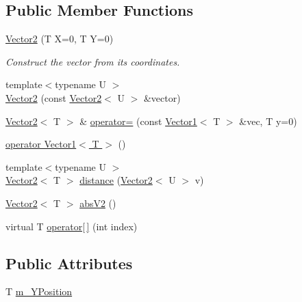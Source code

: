 \subsection*{Public Member Functions}
\begin{DoxyCompactItemize}
\item 
\hyperlink{class_tri_1_1_util_1_1_vector2_a5bd9af497b1e94182828557c8c32d9b2}{Vector2} (T X=0, T Y=0)
\begin{DoxyCompactList}\small\item\em Construct the vector from its coordinates. \end{DoxyCompactList}\item 
{\footnotesize template$<$typename U $>$ }\\\hyperlink{class_tri_1_1_util_1_1_vector2_a9e93686dcffd21464698f12a37b7f5c7}{Vector2} (const \hyperlink{class_tri_1_1_util_1_1_vector2}{Vector2}$<$ U $>$ \&vector)
\item 
\hyperlink{class_tri_1_1_util_1_1_vector2}{Vector2}$<$ T $>$ \& \hyperlink{class_tri_1_1_util_1_1_vector2_a0a679026dfa4fa180af2b77a2c0af691}{operator=} (const \hyperlink{class_tri_1_1_util_1_1_vector1}{Vector1}$<$ T $>$ \&vec, T y=0)
\item 
\hyperlink{class_tri_1_1_util_1_1_vector2_a2ad4acbe3cb1f0af438fe2b99fb04ea2}{operator Vector1$<$ T $>$} ()
\item 
{\footnotesize template$<$typename U $>$ }\\\hyperlink{class_tri_1_1_util_1_1_vector2}{Vector2}$<$ T $>$ \hyperlink{class_tri_1_1_util_1_1_vector2_a958c40bacc64414b2e7605a9aa0795bb}{distance} (\hyperlink{class_tri_1_1_util_1_1_vector2}{Vector2}$<$ U $>$ v)
\item 
\hyperlink{class_tri_1_1_util_1_1_vector2}{Vector2}$<$ T $>$ \hyperlink{class_tri_1_1_util_1_1_vector2_a1030fb4c61ebb13be8127ef599644fd8}{abs\+V2} ()
\item 
virtual T \hyperlink{class_tri_1_1_util_1_1_vector2_a0b6ad3a90190a53461edd5905484d60c}{operator\mbox{[}$\,$\mbox{]}} (int index)
\end{DoxyCompactItemize}
\subsection*{Public Attributes}
\begin{DoxyCompactItemize}
\item 
T \hyperlink{class_tri_1_1_util_1_1_vector2_aa4c9efb1df95560f85c812ffed4fb903}{m\+\_\+\+Y\+Position}
\end{DoxyCompactItemize}
